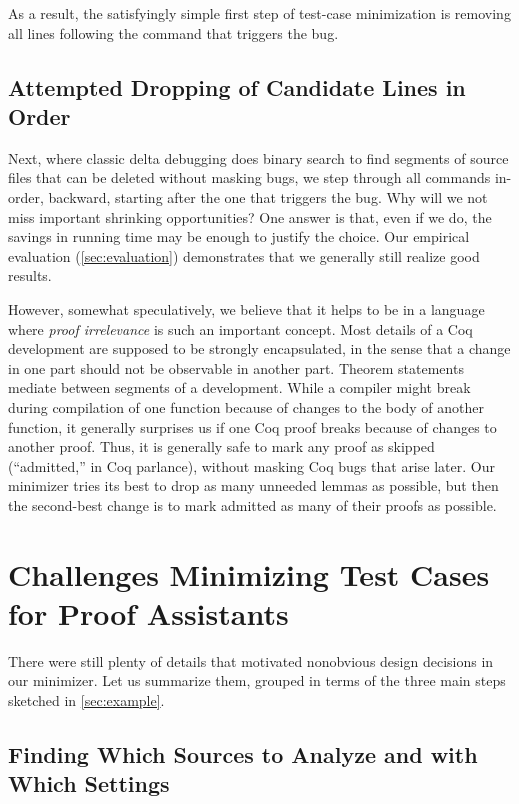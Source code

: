 \documentclass[a4paper,USenglish,cleveref,autoref,thm-restate]{lipics-v2021}
\begin{document}
As a result, the satisfyingly simple first step of test-case minimization is removing all lines following the command that triggers the bug.

\subsection{Attempted Dropping of Candidate Lines in Order}

Next, where classic delta debugging does binary search to find segments of source files that can be deleted without masking bugs, we step through all commands in-order, backward, starting after the one that triggers the bug.
Why will we not miss important shrinking opportunities?
One answer is that, even if we do, the savings in running time may be enough to justify the choice.
Our empirical evaluation (\autoref{sec:evaluation}) demonstrates that we generally still realize good results.

However, somewhat speculatively, we believe that it helps to be in a language where \emph{proof irrelevance} is such an important concept.
Most details of a Coq development are supposed to be strongly encapsulated, in the sense that a change in one part should not be observable in another part.
Theorem statements mediate between segments of a development.
While a compiler might break during compilation of one function because of changes to the body of another function, it generally surprises us if one Coq proof breaks because of changes to another proof.
Thus, it is generally safe to mark any proof as skipped (``admitted,'' in Coq parlance), without masking Coq bugs that arise later.
Our minimizer tries its best to drop as many unneeded lemmas as possible, but then the second-best change is to mark admitted as many of their proofs as possible.


\section{Challenges Minimizing Test Cases for Proof Assistants}\label{sec:harder}

There were still plenty of details that motivated nonobvious design decisions in our minimizer.
Let us summarize them, grouped in terms of the three main steps sketched in \autoref{sec:example}.

\subsection{Finding Which Sources to Analyze and with Which Settings}
\end{document}
